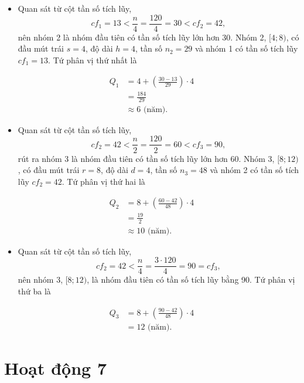 \documentclass[
  letterpaper,
  DIV=11,
  numbers=noendperiod]{scrartcl}
\providecommand{\tightlist}{%
  \setlength{\itemsep}{0pt}\setlength{\parskip}{0pt}}\usepackage{longtable,booktabs,array}
\begin{document}
\begin{itemize}
\tightlist
\item
  Quan sát từ cột tần số tích lũy, \[
    cf_1 = 13 < \frac{n}{4} = \frac{120}{4} = 30 < cf_2 = 42,
  \] nên nhóm 2 là nhóm đầu tiên có tần số tích lũy lớn hơn 30. Nhóm 2,
  \([4; 8)\), có đầu mút trái \(s=4\), độ dài \(h=4\), tần số \(n_2=29\)
  và nhóm 1 có tần số tích lũy \(cf_1 = 13\). Tứ phân vị thứ nhất là
\end{itemize}

\begin{align*}
    Q_1 
        & = 4 + \left (\frac{30-13}{29}\right)\cdot 4 \\
        & = \frac{184}{29} \\
        & \approx 6 \text{ (năm).}
\end{align*}

\begin{itemize}
\tightlist
\item
  Quan sát từ cột tần số tích lũy, \[
    cf_2 = 42 < \frac{n}{2} = \frac{120}{2} = 60 < cf_3 = 90,
  \] rút ra nhóm 3 là nhóm đầu tiên có tần số tích lũy lớn hơn 60. Nhóm
  3, \([8; 12)\), có đầu mút trái \(r=8\), độ dài \(d=4\), tần số
  \(n_3=48\) và nhóm 2 có tần số tích lũy \(cf_2 = 42\). Tứ phân vị thứ
  hai là
\end{itemize}

\begin{align*}
    Q_2
        & = 8 + \left( \frac{60-42}{48}\right)\cdot 4 \\
        & = \frac{19}{2} \\
        & \approx 10 \text{ (năm).}
\end{align*}

\begin{itemize}
\tightlist
\item
  Quan sát từ cột tần số tích lũy, \[
    cf_2=42 < \frac{n}{4} = \frac{3\cdot 120}{4} = 90 = cf_3,
  \] nên nhóm 3, \([8;12)\), là nhóm đầu tiên có tần số tích lũy bằng
  90. Tứ phân vị thứ ba là
\end{itemize}

\begin{align*}
    Q_3
        & = 8 + \left(\frac{90-42}{48}\right)\cdot 4 \\
        & = 12 \text{ (năm).}
\end{align*}

\section*{Hoạt động 7}
\end{document}
